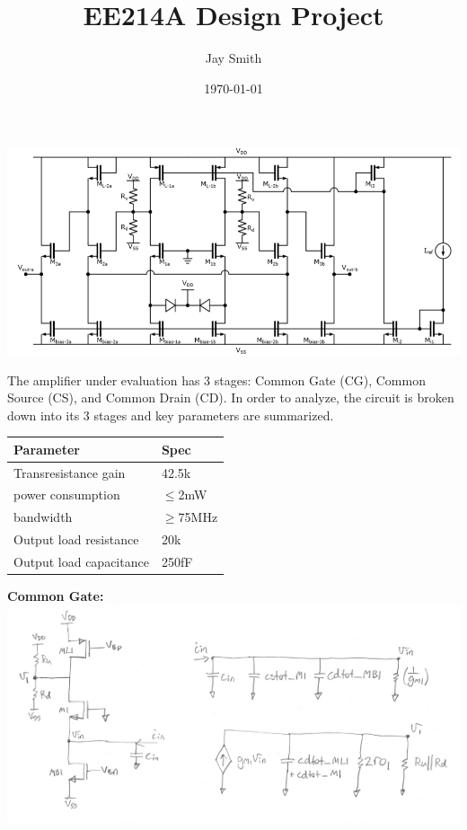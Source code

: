 \documentclass[fleqn]{article}
\title{EE214A Design Project}
\author{Jay Smith}
\date{\today}
\begin{document}
\raggedright
\maketitle
\begin{flushleft}

\includegraphics[scale=0.6]{circuit_architecture}

\large{The amplifier under evaluation has 3 stages: 
Common Gate (CG), Common Source (CS), and Common Drain (CD).  In order to analyze, the circuit is broken down into its 3 stages and key parameters are summarized.}\\
\vspace{5mm} 

\begin{tabular}{ | p{6cm} || p{6cm} | }
\hline
Parameter & Spec\\
\hline
Transresistance gain & 42.5k\\
\hline
power consumption & $\leq$2mW\\
\hline
bandwidth & $\geq$75MHz\\
\hline
Output load resistance & 20k\\
\hline
Output load capacitance & 250fF\\
\hline
\end{tabular}
\vspace{10mm}




\newpage
\textbf{Common Gate:}\\
\includegraphics[scale=1.1]{CG_schematic}


\end{flushleft}
\end{document}
